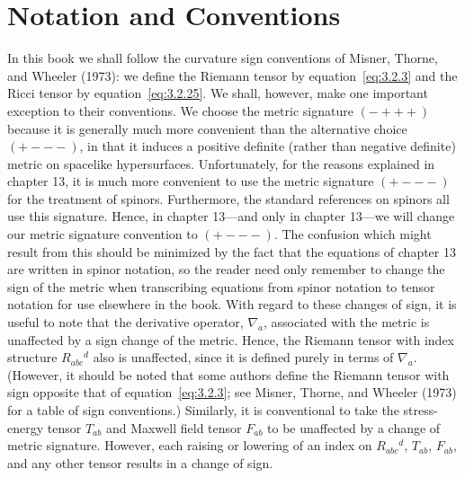 
\section*{Notation and Conventions}

In this book we shall follow the curvature sign conventions of Misner, Thorne,
and Wheeler (1973): we define the Riemann tensor by
equation~\eqref{eq:3.2.3} and the Ricci tensor by
equation~\eqref{eq:3.2.25}. We shall, however, make one important exception to
their conventions. We choose the metric signature \((-+++)\) because it is
generally much more convenient than the alternative choice \((+---)\), in that it
induces a positive definite (rather than negative definite) metric on spacelike
hypersurfaces. Unfortunately, for the reasons explained in chapter 13, it is much
more convenient to use the metric signature \((+---)\) for the treatment of
spinors. Furthermore, the standard references on spinors all use this signature.
Hence, in chapter 13---and only in chapter 13---we will change our metric
signature convention to \((+---)\). The confusion which might result from this
should be minimized by the fact that the equations of chapter 13 are written in
spinor notation, so the reader need only remember to change the sign of the metric
when transcribing equations from spinor notation to tensor notation for use
elsewhere in the book. With regard to these changes of sign, it is useful to note
that the derivative operator, \(\nabla_a\), associated with the metric is unaffected
by a sign change of the metric. Hence, the Riemann tensor with index structure
\(R_{abc}{}^d\) also is unaffected, since it is defined purely in terms of
\(\nabla_a\). (However, it should be noted that some authors define the Riemann
tensor with sign opposite that of equation~\eqref{eq:3.2.3}; see Misner, Thorne,
and Wheeler (1973) for a table of sign conventions.) Similarly, it is conventional
to take the stress-energy tensor \(T_{ab}\) and Maxwell field tensor \(F_{ab}\)
to be unaffected by a change of metric signature. However, each raising or lowering
of an index on \(R_{abc}{}^d\), \(T_{ab}\), \(F_{ab}\), and any other tensor
results in a change of sign.

